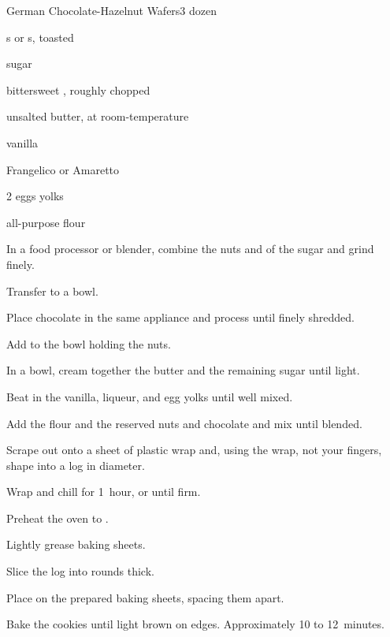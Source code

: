 \begin{recipe}{German Chocolate-Hazelnut Wafers}{}{3 dozen}

\begin{ingredients}
\item {} s or s, toasted
\item \C{\third} sugar
\item {} bittersweet , roughly chopped
\item \C{\half} unsalted butter, at room-temperature
\item {} vanilla
\item {} Frangelico or Amaretto
\item 2 eggs yolks
\item {} all-purpose flour
\end{ingredients}

\begin{directions}
\item In a food processor or blender, combine the nuts and  of the sugar and grind finely.
\item Transfer to a bowl.
\item Place chocolate in the same appliance and process until finely shredded.
\item Add to the bowl holding the nuts.
\item In a bowl, cream together the butter and the remaining sugar until light.
\item Beat in the vanilla, liqueur, and egg yolks until well mixed.
\item Add the flour and the reserved nuts and chocolate and mix until blended.
\item Scrape out onto a sheet of plastic wrap and, using the wrap, not your fingers, shape into a log \inch{2\quarter} in diameter.
\item Wrap and chill for 1~hour, or until firm.
\item Preheat the oven to .
\item Lightly grease baking sheets.
\item Slice the log into rounds \cm{\half} thick.
\item Place on the prepared baking sheets, spacing them \cm{1\half} apart.
\item Bake the cookies until light brown on edges. Approximately 10 to 12~minutes.
\end{directions}

\end{recipe}
